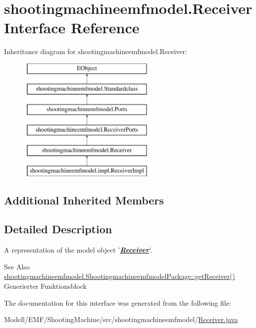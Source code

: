 \hypertarget{interfaceshootingmachineemfmodel_1_1_receiver}{\section{shootingmachineemfmodel.\-Receiver Interface Reference}
\label{interfaceshootingmachineemfmodel_1_1_receiver}
}
Inheritance diagram for shootingmachineemfmodel.\-Receiver\-:\begin{figure}[H]
\begin{center}
\leavevmode
\includegraphics[height=6.000000cm]{interfaceshootingmachineemfmodel_1_1_receiver}
\end{center}
\end{figure}
\subsection*{Additional Inherited Members}


\subsection{Detailed Description}
A representation of the model object '{\itshape {\bfseries \hyperlink{interfaceshootingmachineemfmodel_1_1_receiver}{Receiver}}}'.

\begin{DoxySeeAlso}{See Also}
\hyperlink{interfaceshootingmachineemfmodel_1_1_shootingmachineemfmodel_package_ac1c6a2e46d3815eb0ef44571c1abe6be}{shootingmachineemfmodel.\-Shootingmachineemfmodel\-Package\-::get\-Receiver()}  Generierter Funktionsblock 
\end{DoxySeeAlso}


The documentation for this interface was generated from the following file\-:\begin{DoxyCompactItemize}
\item 
Modell/\-E\-M\-F/\-Shooting\-Machine/src/shootingmachineemfmodel/\hyperlink{_receiver_8java}{Receiver.\-java}\end{DoxyCompactItemize}

